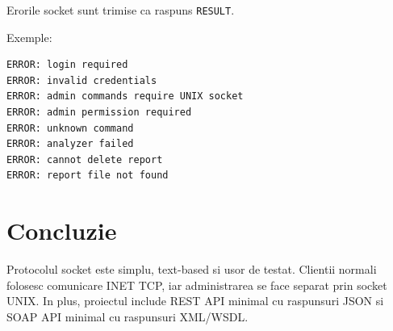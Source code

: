 \documentclass[12pt,a4paper]{article}
\begin{document}
Erorile socket sunt trimise ca raspuns \texttt{RESULT}.

Exemple:

\begin{lstlisting}[style=code]
ERROR: login required
ERROR: invalid credentials
ERROR: admin commands require UNIX socket
ERROR: admin permission required
ERROR: unknown command
ERROR: analyzer failed
ERROR: cannot delete report
ERROR: report file not found
\end{lstlisting}

\section{Concluzie}

Protocolul socket este simplu, text-based si usor de testat. Clientii normali folosesc comunicare INET TCP, iar administrarea se face separat prin socket UNIX. In plus, proiectul include REST API minimal cu raspunsuri JSON si SOAP API minimal cu raspunsuri XML/WSDL.
\end{document}
